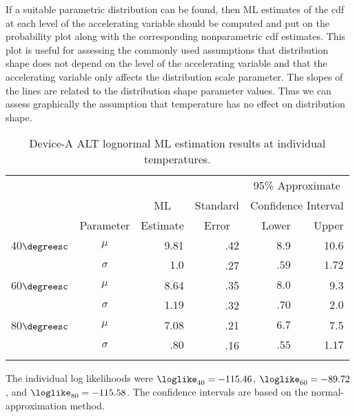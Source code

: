 If a suitable parametric distribution can be found, then ML estimates of the
cdf at each level of the accelerating variable should be computed
and put on the probability plot along with the corresponding
nonparametric cdf estimates. This plot is useful for assessing the
commonly used assumptions that distribution shape does not depend on
the level of the accelerating variable and that the accelerating variable
only affects the distribution scale parameter. The slopes of the 
lines are related to the distribution shape parameter values. Thus
we can assess graphically the assumption that temperature has no effect on 
distribution  shape.
\begin{table}
\caption{Device-A ALT lognormal ML estimation 
results at individual temperatures.}
\centering\small
\begin{tabular}{lcrrrr}
\\[-.5ex] \hline
& & & & \multicolumn{2}{c}{95\% Approximate}\\
&&\multicolumn{1}{c}{ML} &Standard & \multicolumn{2}{c}{Confidence
Interval}\\ \cline{5-6}
& Parameter & Estimate&
\multicolumn{1}{c}{Error} & Lower & Upper \\
\hline 
40$\degreesc$
& $\mu$ &9.81 &.42 &8.9 &10.6 \\[.7ex] 
&$\sigma$ & $1.0$  &.27  & $.59$  & $1.72$ \\[.7ex]
\hline 
60$\degreesc$
& $\mu$ & 8.64 & .35 & $8.0$ & 9.3 \\[.7ex] 
&$\sigma$ &$1.19$  &.32  & $.70$  & $2.0$\\[.7ex] 
\hline 
80$\degreesc$
&$\mu$ &7.08 &.21 &$6.7$ &7.5 \\[.7ex] 
&$\sigma$ &$.80$  &.16 & $.55$  & $1.17$\\[.7ex]
\hline 
\\[-1.8ex]
\end{tabular}
\begin{minipage}[t]{4in}
The individual log likelihoods were
$\loglike_{40} = -115.46 $, $ \loglike_{60} =-89.72 $, 
and $  \loglike_{80} = -115.58 $. The confidence intervals 
are based on the normal-approximation method.
\end{minipage}
\label{table:deva.indiv.mles}
\end{table}


